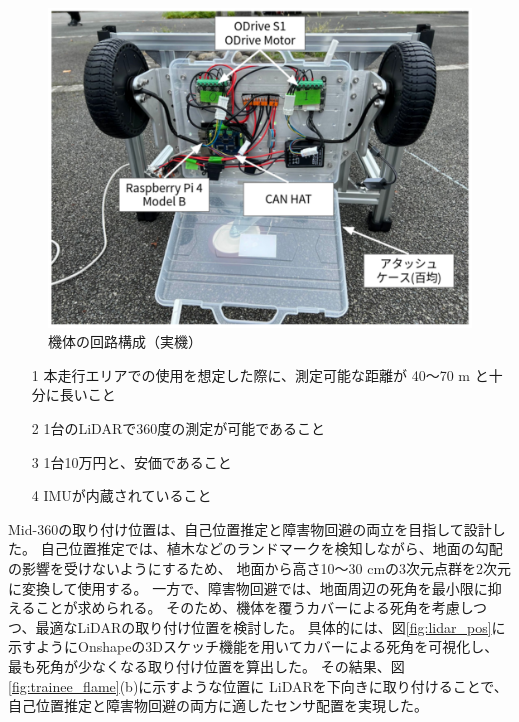 \documentclass[twocolumn,9pt]{jsproceedings}
\begin{document}
\begin{figure}[h]
  \begin{center}
    \includegraphics[width=1.0\linewidth]{figs/trainee_under.pdf}
    \caption{機体の回路構成（実機）}
    \label{fig:trainee_under}
  \end{center}
\end{figure}

\begin{itemize}
  \item[1] 本走行エリアでの使用を想定した際に、測定可能な距離が 40〜70 m と十分に長いこと
  \item[2] 1台のLiDARで360度の測定が可能であること
  \item[3] 1台10万円と、安価であること
  \item[4] IMUが内蔵されていること
\end{itemize}

Mid-360の取り付け位置は、自己位置推定と障害物回避の両立を目指して設計した。
自己位置推定では、植木などのランドマークを検知しながら、地面の勾配の影響を受けないようにするため、
地面から高さ10〜30 cmの3次元点群を2次元に変換して使用する。
一方で、障害物回避では、地面周辺の死角を最小限に抑えることが求められる。
そのため、機体を覆うカバーによる死角を考慮しつつ、最適なLiDARの取り付け位置を検討した。
具体的には、図\ref{fig:lidar_pos}に示すようにOnshapeの3Dスケッチ機能を用いてカバーによる死角を可視化し、
最も死角が少なくなる取り付け位置を算出した。
その結果、図\ref{fig:trainee_flame}(b)に示すような位置に
LiDARを下向きに取り付けることで、自己位置推定と障害物回避の両方に適したセンサ配置を実現した。
\end{document}
